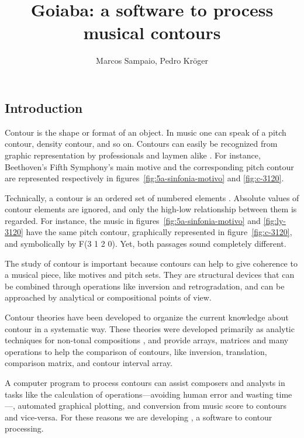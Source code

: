 \documentclass[a0paper]{sciposter}
\title{Goiaba: a software to process musical contours}
\author{Marcos Sampaio, Pedro Kröger}
\institute{Genos---Computer Music Research Group \\
Federal University of Bahia (UFBA). Salvador, Brazil}
\begin{document}



\maketitle

\begin{multicols}{3}

\section{Introduction}

Contour is the shape or format of an object. In music one can speak of
a pitch contour, density contour, and so on. Contours can easily be
recognized from graphic representation by professionals and laymen
alike \cite{marvin88:generalized}. For instance, Beethoven's Fifth
Symphony's main motive and the corresponding pitch contour are
represented respectively in figures~\ref{fig:5a-sinfonia-motivo} and
\ref{fig:c-3120}.

Technically, a contour is an ordered set of numbered elements
\cite{morris93:directions}. Absolute values of contour elements are
ignored, and only the high-low relationship between them is regarded.
For instance, the music in figures~\ref{fig:5a-sinfonia-motivo} and
\ref{fig:ly-3120} have the same pitch contour, graphically represented
in figure~\ref{fig:c-3120}, and symbolically by F(3 1 2 0). Yet, both
passages sound completely different.

The study of contour is important because contours can help to give
coherence to a musical piece, like motives and pitch sets. They are
structural devices that can be combined through operations like
inversion and retrogradation, and can be approached by analytical or
compositional points of view.

Contour theories
\cite{friedmann85:methodology,morris87:composition,marvin88:generalized,beard03:contour}
have been developed to organize the current knowledge about contour in
a systematic way. These theories were developed primarily as analytic
techniques for non-tonal compositions \cite{beard03:contour}, and
provide arrays, matrices and many operations to help the comparison of
contours, like inversion, translation, comparison matrix, and contour
interval array.

A computer program to process contours can assist composers and
analysts in tasks like the calculation of operations---avoiding human
error and wasting time---, automated graphical plotting, and
conversion from music score to contours and vice-versa. For these
reasons we are developing \goiaba{}, a software to contour processing.


\end{multicols}
\end{document}
